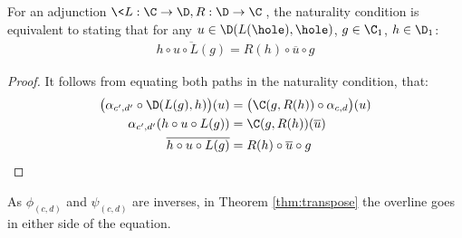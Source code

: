 \begin{theorem}
  For an adjunction $\<L: \C\to \D, R:\D\to \C\>$, the naturality condition is
  equivalent to stating that for any $u\in \D(L(\hole), \hole)$, $g \in \C_1$,
  $h\in \D_1$:
  \begin{align*}
    \overline{h\circ u \circ L(g)} = R(h) \circ \overline{u} \circ g
  \end{align*}

  \begin{proof}
    It follows from equating both paths in the naturality condition, that:
    \[
      \begin{aligned}
      \big(\alpha_{c', d'} \circ \D(L(g), h)\big)(u)
        &= \big(\C(g, R(h)) \circ \alpha_{c, d}\big)(u)\\
      \alpha_{c', d'}(h\circ u \circ L(g))
        &= \C(g, R(h))(\overline{u})\\
      \overline{h\circ u \circ L(g)}
        &= R(h) \circ \overline{u} \circ g
      \end{aligned}
    \]
  \end{proof}
\end{theorem}

\begin{remark}
  As $\phi_{(c, d)}$ and $\psi_{(c, d)}$ are inverses, in Theorem
  \ref{thm:transpose} the overline goes in either side of the equation.
\end{remark}

